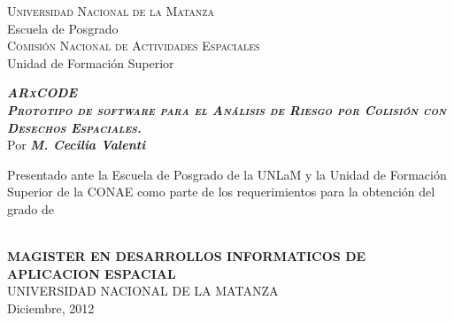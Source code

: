 %
%

\begin{titlepage}
\begin{center}

\begin{figure}[h]
\centering
\hspace{3cm}
\hspace{3cm}
 
 \end{figure} 

\normalsize \textsc{Universidad Nacional de la Matanza}\\
\vspace*{0.1cm}
\normalsize {Escuela de Posgrado}\\
\vspace*{0.5cm}
\centering
\normalsize \textsc{Comisión Nacional de Actividades Espaciales}\\
\vspace*{0.1cm}
\normalsize {Unidad de Formación Superior}\\
\vspace*{3cm}

\vspace*{0.3cm}
\bigskip
\large
\textsc{\textsl{\textbf{ARxCODE\\Prototipo de software para el An\'alisis de Riesgo por Colisi\'on con Desechos Espaciales.}}}\\
\vspace*{1cm}
\normalsize Por \textit{\textbf{M. Cecilia Valenti}}\\
\vspace*{3cm}
\begin{normalsize}Presentado ante la Escuela de Posgrado de la UNLaM y la Unidad de Formación Superior de la CONAE como parte de los requerimientos para la obtención del grado de\end{normalsize}\\
\vspace*{1cm}
\textbf{MAGISTER EN DESARROLLOS INFORMATICOS DE APLICACION ESPACIAL}\\
\vspace*{3.5cm}
UNIVERSIDAD NACIONAL DE LA MATANZA\\
\vspace*{0.1cm}
{Diciembre, 2012}\\


\end{center}
\end{titlepage}
